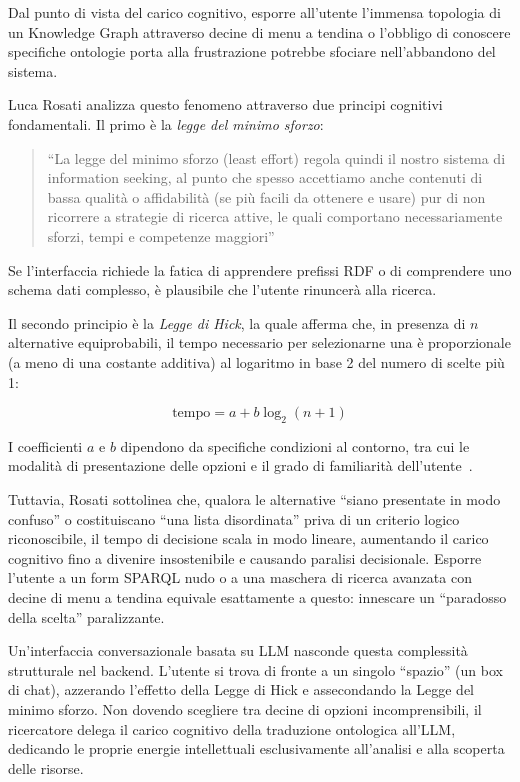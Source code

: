 \documentclass[12pt,a4paper,oneside]{book}
\begin{document}
    Dal punto di vista del carico cognitivo, esporre all'utente l'immensa topologia di un Knowledge Graph attraverso decine di menu a tendina o l'obbligo di conoscere specifiche ontologie porta alla frustrazione potrebbe sfociare nell'abbandono del sistema.

    Luca Rosati analizza questo fenomeno attraverso due principi cognitivi fondamentali. Il primo è la \textit{legge del minimo sforzo}:

    \begin{quotation}
    ``La legge del minimo sforzo (least effort) regola quindi il nostro sistema di information seeking, al punto che spesso accettiamo anche contenuti di bassa qualità o affidabilità (se più facili da ottenere e usare) pur di non ricorrere a strategie di ricerca attive, le quali comportano necessariamente sforzi, tempi e competenze maggiori''\hfill\cite{Ros07}
    \end{quotation}

    Se l'interfaccia richiede la fatica di apprendere prefissi RDF o di comprendere uno schema dati complesso, è plausibile che l'utente rinuncerà alla ricerca.

    Il secondo principio è la \textit{Legge di Hick}, la quale afferma che, in presenza di $n$ alternative equiprobabili, il tempo necessario per selezionarne una è proporzionale (a meno di una costante additiva) al logaritmo in base 2 del numero di scelte più 1:

    \[ \text{tempo} = a + b \log_2(n+1) \]

    I coefficienti $a$ e $b$ dipendono da specifiche condizioni al contorno, tra cui le modalità di presentazione delle opzioni e il grado di familiarità dell'utente~\cite{Ros07}.

    Tuttavia, Rosati sottolinea che, qualora le alternative ``siano presentate in modo confuso'' o costituiscano ``una lista disordinata'' priva di un criterio logico riconoscibile, il tempo di decisione scala in modo lineare, aumentando il carico cognitivo fino a divenire insostenibile e causando paralisi decisionale. Esporre l'utente a un form SPARQL nudo o a una maschera di ricerca avanzata con decine di menu a tendina equivale esattamente a questo: innescare un ``paradosso della scelta'' paralizzante.

    Un'interfaccia conversazionale basata su LLM nasconde questa complessità strutturale nel backend. L'utente si trova di fronte a un singolo ``spazio'' (un box di chat), azzerando l'effetto della Legge di Hick e assecondando la Legge del minimo sforzo. Non dovendo scegliere tra decine di opzioni incomprensibili, il ricercatore delega il carico cognitivo della traduzione ontologica all'LLM, dedicando le proprie energie intellettuali esclusivamente all'analisi e alla scoperta delle risorse.
\end{document}

